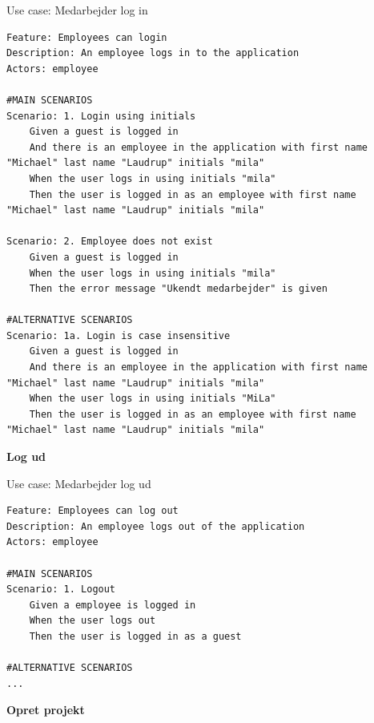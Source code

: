 \begin{listing}[H]
    \centering
    \caption{Use case: Medarbejder log in}\label{lst:usecase_login}
    \begin{verbatim}  
Feature: Employees can login
Description: An employee logs in to the application
Actors: employee

#MAIN SCENARIOS
Scenario: 1. Login using initials
    Given a guest is logged in
    And there is an employee in the application with first name "Michael" last name "Laudrup" initials "mila" 
    When the user logs in using initials "mila" 
    Then the user is logged in as an employee with first name "Michael" last name "Laudrup" initials "mila" 

Scenario: 2. Employee does not exist
    Given a guest is logged in
    When the user logs in using initials "mila" 
    Then the error message "Ukendt medarbejder" is given 

#ALTERNATIVE SCENARIOS
Scenario: 1a. Login is case insensitive
    Given a guest is logged in
    And there is an employee in the application with first name "Michael" last name "Laudrup" initials "mila" 
    When the user logs in using initials "MiLa" 
    Then the user is logged in as an employee with first name "Michael" last name "Laudrup" initials "mila" 
    \end{verbatim}
\end{listing}
\textbf{Log ud}
\begin{listing}[H]
    \centering
    \caption{Use case: Medarbejder log ud}\label{lst:usecase_logout}
    \begin{verbatim}  
Feature: Employees can log out
Description: An employee logs out of the application
Actors: employee

#MAIN SCENARIOS
Scenario: 1. Logout
    Given a employee is logged in
    When the user logs out
    Then the user is logged in as a guest

#ALTERNATIVE SCENARIOS
...
    \end{verbatim}
\end{listing}\newpage
\textbf{Opret projekt}
